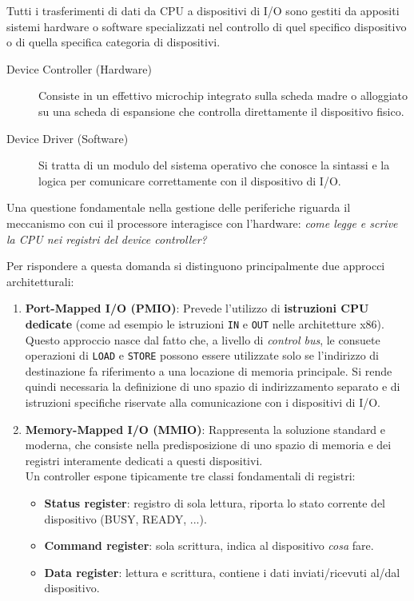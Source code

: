 \documentclass[12pt]{report}
\begin{document}
	Tutti i trasferimenti di dati da CPU a dispositivi di I/O sono gestiti da appositi sistemi hardware o software specializzati nel controllo di quel specifico dispositivo o di quella specifica categoria di dispositivi.
	
	\begin{description}
		\item[Device Controller (Hardware)] 
		Consiste in un effettivo microchip integrato sulla scheda madre o alloggiato su una scheda di espansione che controlla direttamente il dispositivo fisico.
		
		\item[Device Driver (Software)] 
		Si tratta di un modulo del sistema operativo che conosce la sintassi e la logica per comunicare correttamente con il dispositivo di I/O.
		
	\end{description}
	
	Una questione fondamentale nella gestione delle periferiche riguarda il meccanismo con cui il processore interagisce con l'hardware: \textit{come legge e scrive la CPU nei registri del device controller?}
	
	Per rispondere a questa domanda si distinguono principalmente due approcci architetturali:
	
	\begin{enumerate}
		\item \textbf{Port-Mapped I/O (PMIO)}:
		Prevede l'utilizzo di \textbf{istruzioni CPU dedicate} (come ad esempio le istruzioni \texttt{IN} e \texttt{OUT} nelle architetture x86). Questo approccio nasce dal fatto che, a livello di \textit{control bus}, le consuete operazioni di \texttt{LOAD} e \texttt{STORE} possono essere utilizzate solo se l'indirizzo di destinazione fa riferimento a una locazione di memoria principale. Si rende quindi necessaria la definizione di uno spazio di indirizzamento separato e di istruzioni specifiche riservate alla comunicazione con i dispositivi di I/O.
		
		\item \textbf{Memory-Mapped I/O (MMIO)}:
		Rappresenta la soluzione standard e moderna, che consiste nella predisposizione di uno spazio di memoria e dei registri interamente dedicati a questi dispositivi.\\
		Un controller espone tipicamente tre classi fondamentali di registri:
		\begin{itemize}
			\item \textbf{Status register}: registro di sola lettura, riporta lo stato corrente del dispositivo (BUSY, READY, ...).
			
			\item \textbf{Command register}: sola scrittura, indica al dispositivo \textit{cosa} fare.
			
			\item \textbf{Data register}: lettura e scrittura, contiene i dati inviati/ricevuti al/dal dispositivo.
		\end{itemize}
	\end{enumerate}
	
\end{document}
